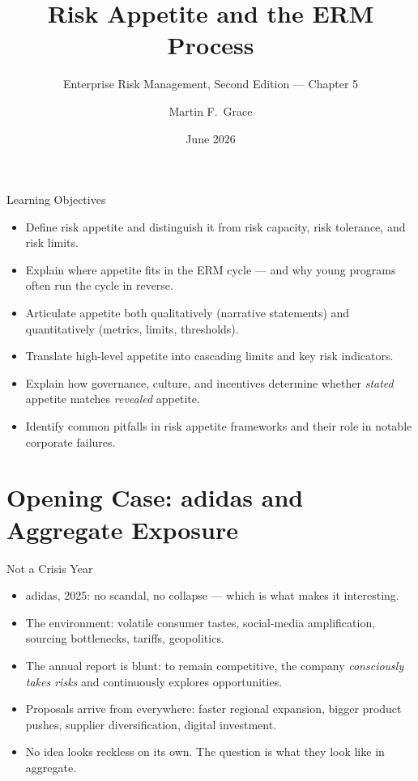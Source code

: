 \documentclass[11pt, aspectratio=169]{beamer}
\title[ERM Ch.\,5]{Risk Appetite and the ERM Process}
\subtitle{Enterprise Risk Management, Second Edition --- Chapter 5}
\author{Martin F.\ Grace}
\institute{University of Iowa\\[2pt] Tippie College of Business\\[2pt] Vaughan Institute of Risk Management}
\date{June 2026}
\begin{document}
\begin{frame}[plain]
\titlepage
\end{frame}

\begin{frame}{Learning Objectives}
\begin{itemize}
  \item Define \alert{risk appetite} and distinguish it from risk capacity, risk tolerance, and risk limits.
  \item Explain where appetite fits in the ERM cycle --- and why young programs often run the cycle in reverse.
  \item Articulate appetite both qualitatively (narrative statements) and quantitatively (metrics, limits, thresholds).
  \item Translate high-level appetite into cascading limits and key risk indicators.
  \item Explain how governance, culture, and incentives determine whether \emph{stated} appetite matches \emph{revealed} appetite.
  \item Identify common pitfalls in risk appetite frameworks and their role in notable corporate failures.
\end{itemize}
\end{frame}

\section{Opening Case: adidas and Aggregate Exposure}

\begin{frame}{Not a Crisis Year}
\begin{itemize}
  \item adidas, 2025: no scandal, no collapse --- which is what makes it interesting.
  \item The environment: volatile consumer tastes, social-media amplification, sourcing bottlenecks, tariffs, geopolitics.
  \item The annual report is blunt: to remain competitive, the company \emph{consciously takes risks} and continuously explores opportunities.
  \item Proposals arrive from everywhere: faster regional expansion, bigger product pushes, supplier diversification, digital investment.
  \item No idea looks reckless on its own. The question is what they look like \alert{in aggregate}.
\end{itemize}
\end{frame}
\end{document}
